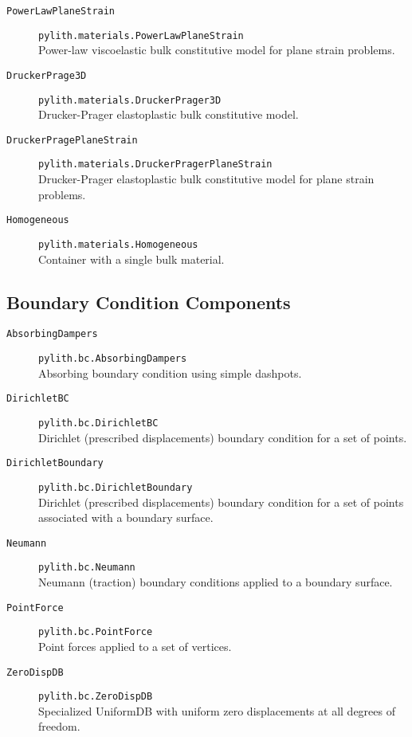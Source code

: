 \begin{description}
\item [{\texttt{PowerLawPlaneStrain}}] \texttt{pylith.materials.PowerLawPlaneStrain}\\
Power-law viscoelastic bulk constitutive model for plane strain problems.
\item [{\texttt{DruckerPrage3D}}] \texttt{pylith.materials.DruckerPrager3D}\\
Drucker-Prager elastoplastic bulk constitutive model.
\item [{\texttt{DruckerPragePlaneStrain}}] \texttt{pylith.materials.DruckerPragerPlaneStrain}\\
Drucker-Prager elastoplastic bulk constitutive model for plane strain
problems.
\item [{\texttt{Homogeneous}}] \texttt{pylith.materials.Homogeneous}\\
Container with a single bulk material.
\end{description}

\subsection{Boundary Condition Components}
\begin{description}
\item [{\texttt{AbsorbingDampers}}] \texttt{pylith.bc.AbsorbingDampers}\\
Absorbing boundary condition using simple dashpots.
\item [{\texttt{DirichletBC}}] \texttt{pylith.bc.DirichletBC}\\
Dirichlet (prescribed displacements) boundary condition for a set
of points.
\item [{\texttt{DirichletBoundary}}] \texttt{pylith.bc.DirichletBoundary}\\
Dirichlet (prescribed displacements) boundary condition for a set
of points associated with a boundary surface.
\item [{\texttt{Neumann}}] \texttt{pylith.bc.Neumann}\\
Neumann (traction) boundary conditions applied to a boundary surface.
\item [{\texttt{PointForce}}] \texttt{pylith.bc.PointForce}\\
Point forces applied to a set of vertices.
\item [{\texttt{ZeroDispDB}}] \texttt{pylith.bc.ZeroDispDB}\\
Specialized UniformDB with uniform zero displacements at all degrees
of freedom.
\end{description}

